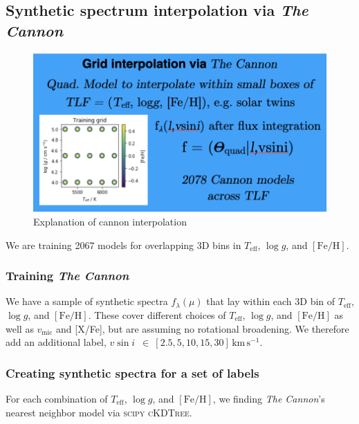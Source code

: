 \documentclass[
  journal=pasa,
  manuscript=research-paper, %
  year=2021,
  volume=37,
]{cup-journal}
\newcommand{\Teff}{$T_\mathrm{eff}$\xspace}
\newcommand{\logg}{$\log g$\xspace}
\newcommand{\feh}{$\mathrm{[Fe/H]}$\xspace}
\newcommand{\vmic}{$v_\mathrm{mic}$\xspace}
\newcommand{\vsini}{$v \sin i$\xspace}
\newcommand{\TheCannon}{\textit{The Cannon}\xspace}
\newcommand{\TLF}{\Teff, \logg, and \feh}
\newcommand{\kms}{\,\mathrm{km\,s^{-1}}}	%
\begin{document}
\subsection{Synthetic spectrum interpolation via \TheCannon}

\begin{figure}[hbt!]
 \centering
 \includegraphics[width=\columnwidth]{figures/cannon_interpolation.png}
 \caption{Explanation of cannon interpolation}
 \label{fig:cannon_interpolation}
\end{figure}

We are training 2067 models for overlapping 3D bins in \Teff, \logg, and \feh.

\subsubsection{Training \TheCannon} \label{sec:cannon_input}

We have a sample of synthetic spectra $f_\lambda (\mu)$ that lay within each 3D bin of \TLF. These cover different choices of \TLF as well as \vmic and [X/Fe], but are assuming no rotational broadening. We therefore add an additional label, \vsini~$\in~[2.5, 5, 10, 15, 30] \kms$.

\subsubsection{Creating synthetic spectra for a set of labels} \label{sec:cannon_synthesis}

For each combination of \TLF, we finding \TheCannon's nearest neighbor model via \textsc{scipy} \textsc{cKDTree}.
\end{document}
